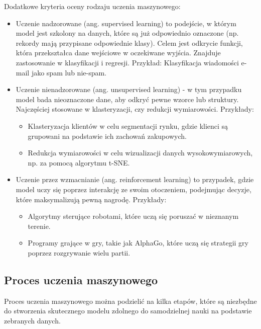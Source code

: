 Dodatkowe kryteria oceny rodzaju uczenia maszynowego:
\begin{itemize}[label=-,labelsep=0.4cm,leftmargin=0.6cm]
    \item Uczenie nadzorowane (ang. supervised learning) to podejście, w którym model jest szkolony na danych,
        które są już odpowiednio oznaczone (np. rekordy mają przypisane odpowiednie klasy).
        Celem jest odkrycie funkcji, która przekształca dane wejściowe w oczekiwane wyjścia.
        Znajduje zastosowanie w klasyfikacji i regresji.
        Przykład: Klasyfikacja wiadomości e-mail jako spam lub nie-spam.
    \item Uczenie nienadzorowane (ang. unsupervised learning)
        - w tym przypadku model bada nieoznaczone dane, aby odkryć pewne wzorce lub struktury.
        Najczęściej stosowane w klasteryzacji, czy redukcji wymiarowości. Przykłady:
        \begin{itemize}[label=*,labelsep=0.4cm,leftmargin=0.8cm]
            \item Klasteryzacja klientów w celu segmentacji rynku, gdzie klienci są grupowani na podstawie ich zachowań zakupowych. 
            \item Redukcja wymiarowości w celu wizualizacji danych wysokowymiarowych, np. za pomocą algorytmu t-SNE.
        \end{itemize}
    \item Uczenie przez wzmacnianie (ang. reinforcement learning) to przypadek,
        gdzie model uczy się poprzez interakcję ze swoim otoczeniem,
        podejmując decyzje, które maksymalizują pewną nagrodę. Przykłady:
        \begin{itemize}[label=*,labelsep=0.4cm,leftmargin=0.8cm]
            \item Algorytmy sterujące robotami, które uczą się poruszać w nieznanym terenie. 
            \item Programy grające w gry, takie jak AlphaGo, które uczą się strategii gry poprzez rozgrywanie wielu partii.
        \end{itemize}
\end{itemize}

\subsection{Proces uczenia maszynowego}
Proces uczenia maszynowego można podzielić na kilka etapów,
które są niezbędne do stworzenia skutecznego modelu zdolnego do samodzielnej nauki na podstawie zebranych danych.

